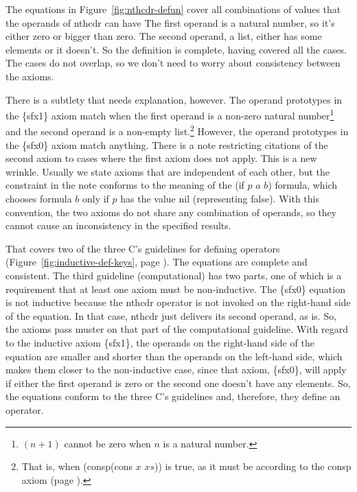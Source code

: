 
The equations in Figure~\ref{fig:nthcdr-defun} cover all combinations
of values that the operands of nthcdr can have
The first operand is a natural number,
so it's either zero or bigger than zero.
The second operand, a list, either has some elements or it doesn't.
So the definition is complete, having covered all the cases.
The cases do not overlap, so we don't need to worry about
consistency between the axioms.

There is a subtlety that needs explanation, however.
The operand prototypes in the
\{sfx1\} axiom match when the first operand is a non-zero natural number\footnote{$(n+1)$
cannot be zero when $n$ is a natural number.}
and the second operand is a non-empty list.\footnote{That
is, when (consp(cons $x$ $xs$)) is true,
as it must be according to the consp axiom (page \pageref{consp-axiom}).}
However, the operand prototypes in the \{sfx0\} axiom match anything.
There is a note restricting
citations of the second axiom to cases
where the first axiom does not apply.
This is a new wrinkle.
Usually we state axioms that are independent of each other,
but the constraint in the note conforms to the meaning
of the (if $p$ $a$ $b$) formula, which chooses formula $b$
only if $p$ has the value nil (representing false).
With this convention, the two axioms
do not share any combination of operands, so they cannot
cause an inconsistency in the specified results.

That covers two of the three C's guidelines for defining operators
(Figure~\ref{fig:inductive-def-keys}, page \pageref{fig:inductive-def-keys}).
The equations are complete and consistent.
The third guideline (computational) has two parts, one of which is
a requirement that at least one axiom must be non-inductive.
The \{sfx0\} equation is not inductive because the nthcdr operator
is not invoked on the right-hand side of the equation.
In that case, nthcdr just delivers its second operand, as is.
So, the axioms pass muster on that part of the computational guideline.
With regard to the inductive axiom \{sfx1\},
the operands on the right-hand side of the equation are
smaller and shorter than the operands on the left-hand side,
which makes them closer to the non-inductive case,
since that axiom, \{sfx0\}, will apply if either the first
operand is zero or the second one doesn't have any elements.
So, the equations conform to the three C's guidelines and,
therefore, they define an operator.

